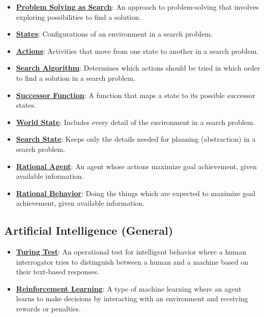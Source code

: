 \documentclass{article}%
\begin{document}
\begin{itemize}[leftmargin=*]
\item \href{https://www.math.purdue.edu/~yipn/351/14L1-DepthFS.pdf#page=12}{\textbf{Problem Solving as Search}}: An approach to problem-solving that involves exploring possibilities to find a solution.%
\item \href{https://www.math.purdue.edu/~yipn/351/14L1-DepthFS.pdf#page=14}{\textbf{States}}: Configurations of an environment in a search problem.%
\item \href{https://www.math.purdue.edu/~yipn/351/14L1-DepthFS.pdf#page=14}{\textbf{Actions}}: Activities that move from one state to another in a search problem.%
\item \href{https://www.math.purdue.edu/~yipn/351/14L1-DepthFS.pdf#page=14}{\textbf{Search Algorithm}}: Determines which actions should be tried in which order to find a solution in a search problem.%
\item \href{https://www.math.purdue.edu/~yipn/351/14L1-DepthFS.pdf#page=36}{\textbf{Successor Function}}: A function that maps a state to its possible successor states.%
\item \href{https://www.math.purdue.edu/~yipn/351/14L1-DepthFS.pdf#page=37}{\textbf{World State}}: Includes every detail of the environment in a search problem.%
\item \href{https://www.math.purdue.edu/~yipn/351/14L1-DepthFS.pdf#page=37}{\textbf{Search State}}: Keeps only the details needed for planning (abstraction) in a search problem.%
\item \href{https://www.math.purdue.edu/~yipn/351/14L1-DepthFS.pdf#page=39}{\textbf{Rational Agent}}: An agent whose actions maximize goal achievement, given available information.%
\item \href{https://www.math.purdue.edu/~yipn/351/14L1-DepthFS.pdf#page=39}{\textbf{Rational Behavior}}: Doing the things which are expected to maximize goal achievement, given available information.%
\end{itemize}

%
\subsection{Artificial Intelligence (General)}%
\label{subsec:ArtificialIntelligence(General)}%
\begin{itemize}[leftmargin=*]%
\item \href{https://www.math.purdue.edu/~yipn/351/02L2-Intro.pdf#page=6}{\textbf{Turing Test}}: An operational test for intelligent behavior where a human interrogator tries to distinguish between a human and a machine based on their text-based responses.%
\item \href{https://www.math.purdue.edu/~yipn/351/02L2-Intro.pdf#page=46}{\textbf{Reinforcement Learning}}: A type of machine learning where an agent learns to make decisions by interacting with an environment and receiving rewards or penalties.%
\end{itemize}
\end{document}
